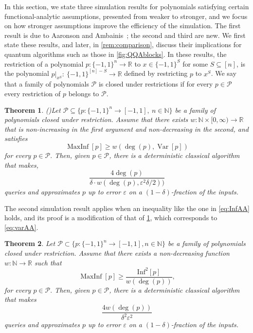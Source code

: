 \documentclass[11pt]{article}
\DeclareMathOperator{\var}{Var}
\DeclareMathOperator{\maxinf}{MaxInf}
\newcommand{\R}{\mathbb{R}} %
\newcommand{\N}{\mathbb{N}} %
\newcommand{\1}{\mathbf{1}}
\newcommand\Inf{\mathrm{Inf}}
\newcommand{\eps}{\varepsilon}
\theoremstyle{plain}
\newtheorem{theorem}{Theorem}[section]
\theoremstyle{definition}
\theoremstyle{remark}
\begin{document}
In this section, we state three simulation results for polynomials satisfying certain functional-analytic assumptions, presented from weaker to stronger, and we focus on how stronger assumptions improve the efficiency of the simulation. The first result is due to Aaronson and Ambainis~\cite{Aaronsons:2014}; the second and third are new. We first state these results, and later, in \cref{rem:comparison}, discuss their implications for quantum algorithms such as those in \cref{fig:QQAblocks}. In these results, the restriction of a polynomial $p:\{-1,1\}^n\to \R$ to $x\in\{-1,1\}^S$ for some $S\subseteq[n]$, is the polynomial $p|_{x^S}:~\{-1,1\}^{[n]-S}\to \R$ defined by restricting $p$ to $x^S$. We say that a family of polynomials $\mathcal P$ is closed under restrictions if for every $p\in\mathcal P$ every restriction of $p$ belongs to $\mathcal P.$


\begin{theorem}{\normalfont (\cite[Theorem 22]{Aaronsons:2014})}\label{theo:simAA}
    Let $\mathcal P \subseteq\{p:\{-1,1\}^n\to [-1,1],\ n\in \N\}$  be a family of polynomials closed under restriction. Assume that there exists $w:\N\times [0,\infty)\to \R$ that is non-increasing in the first argument and non-decreasing in the second, and satisfies $$\maxinf[p]\geq w(\deg(p),\var [p])$$ for every $p\in \mathcal P.$ Then, given $p\in\mathcal P$, there is a deterministic classical algorithm that makes, $$\frac{4\deg(p)}{\delta\cdot w(\deg(p),\eps^2\delta/2))}$$ queries and approximates $p$ up to error  $\eps$ on a $(1-\delta)$-fraction of the inputs.
\end{theorem}

The second simulation result applies when an inequality like the one in \cref{eq:InfAA} holds, and its proof is a modification of that of \cref{theo:simAA}, which corresponds to \cref{eq:varAA}.

\begin{theorem}\label{theo:simInf}
    Let $\mathcal P\subset \{p:\{-1,1\}^n\to [-1,1], n \in \mathbb{N}\}$ be a family of polynomials closed under restriction. Assume that there exists a non-decreasing function $w:\N\to \R$ such that $$ \maxinf [p]\geq \frac{\Inf^2[p]}{ w(\deg(p))},$$ for every $p\in \mathcal P.$ Then, given $p\in\mathcal P$, there is a deterministic classical algorithm that makes $$\frac{4 w(\deg(p))}{\delta^2\eps^2}$$ queries and approximates $p$ up to error  $\eps$ on a $(1-\delta)$-fraction of the inputs.    
\end{theorem}
\end{document}
